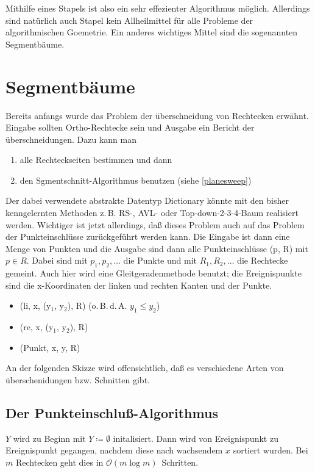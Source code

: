 \documentclass[ngerman,draft,parskip=half*,twoside]{scrreprt}
\theoremstyle{break}
\theoremstyle{nonumberbreak}
\newcommand*{\OO}{\mathcal{O}}      %
\begin{document}
Mithilfe eines Stapels ist also ein sehr effezienter Algorithmus möglich. Allerdings sind natürlich auch Stapel kein Allheilmittel
für alle Probleme der algorithmischen Goemetrie. Ein anderes wichtiges Mittel sind die sogenannten Segmentbäume.

\section{Segmentbäume}
Bereits anfangs wurde das Problem der überschneidung von Rechtecken erwähnt. Eingabe sollten Ortho-Rechtecke sein und Ausgabe ein
Bericht der überschneidungen. Dazu kann man
\begin{enumerate}
\item alle Rechteckseiten bestimmen und dann
\item den Sgmentschnitt-Algorithmus benutzen (siehe \autoref{planesweep})
\end{enumerate}

Der dabei verwendete abstrakte Datentyp Dictionary könnte mit den bisher kenngelernten Methoden z.\,B. RS-, AVL- oder
Top-down-2-3-4-Baum realisiert werden.
Wichtiger ist jetzt allerdings, daß dieses Problem auch auf das Problem der Punkteinschlüsse zurückgeführt werden kann. Die Eingabe
ist dann eine Menge von Punkten und die Ausgabe sind dann alle Punkteinschlüsse (p, R) mit $p  \in  R$. Dabei sind mit $p_1,   p_2,
  \ldots$ die Punkte und mit $R_1,   R_2,   \ldots$ die Rechtecke gemeint. Auch hier wird eine Gleitgeradenmethode benutzt; die
Ereignispunkte sind die x-Koordinaten der linken und rechten Kanten und der Punkte.
\begin{itemize}
\item[] (li, x, (y$_1$, y$_2$), R) \hspace{2cm} (o.\,B.\,d.\,A. $y_1 \leq y_2$)
\item[] (re, x, (y$_1$, y$_2$), R)
\item[] (Punkt, x, y, R)
\end{itemize}

An der folgenden Skizze wird offensichtlich, daß es verschiedene Arten von überschenidungen bzw. Schnitten gibt. 
\begin{figure}[H]
\centering


\end{figure}

\subsection{Der Punkteinschluß-Algorithmus}
$Y$ wird zu Beginn  mit $Y\coloneqq \emptyset$ initalisiert. Dann wird von Ereignispunkt zu Ereignispunkt gegangen, nachdem diese nach wachsendem
$x$ sortiert wurden. Bei $m$ Rechtecken geht dies in $\OO(m\log m)$~Schritten.
\end{document}
